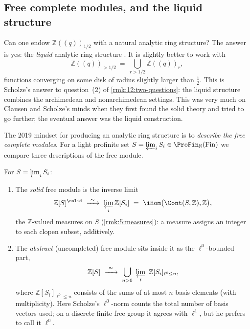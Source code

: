 \subsection{Free complete modules, and the liquid structure}

\begin{remark}
\label{rmk:12:liquid-question}
Can one endow $\mathbb{Z}(\!(q)\!)_{1/2}$ with a natural analytic ring structure?
The answer is yes: the \emph{liquid} analytic ring structure
\cite{clausen2020analytic}. It is slightly better to work with
\begin{equation*}
\mathbb{Z}(\!(q)\!)_{>1/2}\ =\ \bigcup_{r>1/2}\mathbb{Z}(\!(q)\!)_{r},
\end{equation*}
functions converging on some disk of radius slightly larger than $\tfrac12$.
This is Scholze's answer to question~(2) of \cref{rmk:12:two-questions}: the
liquid structure combines the archimedean and nonarchimedean settings. This was
very much on Clausen and Scholze's minds when they first found the solid theory
and tried to go further; the eventual answer was the liquid construction.
\end{remark}

The 2019 mindset for producing an analytic ring structure is to \emph{describe
the free complete modules}. For a light profinite set $S=\varprojlim_i S_i\in
\ProFin_{\mathbb{N}}(\mathrm{Fin})$ we compare three descriptions of the free
module.

\begin{example}
\label{ex:12:free-solid-abstract}
For $S=\varprojlim_i S_i$:
\begin{enumerate}
\item The \emph{solid} free module is the inverse limit
\begin{equation*}
\mathbb{Z}[S]^{\solid}\ \xrightarrow{\ \sim\ }\ \varprojlim_i \mathbb{Z}[S_i]
\ =\ \iHom\bigl(\Cont(S,\mathbb{Z}),\mathbb{Z}\bigr),
\end{equation*}
the $\mathbb{Z}$-valued measures on $S$ (\cref{rmk:5:measures}): a measure assigns
an integer to each clopen subset, additively.
\item The \emph{abstract} (uncompleted) free module sits inside it as the
$\ell^{0}$-bounded part,
\begin{equation}
\label{eq:12:free-abstract}
\mathbb{Z}[S]\ \xrightarrow{\ \cong\ }\
\bigcup_{n>0}\ \varprojlim_i\ \mathbb{Z}[S_i]_{\ell^{0}\le n},
\end{equation}
where $\mathbb{Z}[S_i]_{\ell^{0}\le n}$ consists of the sums of at most $n$ basis
elements (with multiplicity). Here Scholze's $\ell^{0}$-norm counts the total
number of basis vectors used; on a discrete finite free group it agrees with
$\ell^{1}$, but he prefers to call it $\ell^{0}$.
\end{enumerate}
\end{example}

